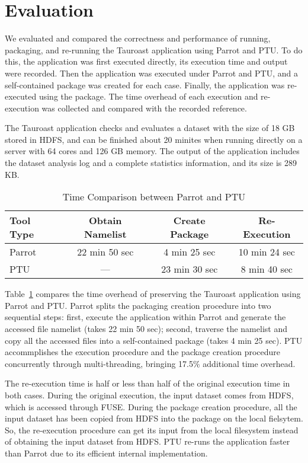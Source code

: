 \section{Evaluation}

We evaluated and compared the correctness and performance of running, packaging, and re-running the Tauroast application using Parrot and PTU.
To do this, the application was first executed directly, its execution time and output were recorded. Then the application was executed under Parrot and PTU, and a self-contained package was created for each case. Finally, the application was re-executed using the package. The time overhead of each execution and re-execution was collected and compared with the recorded reference.

The Tauroast application checks and evaluates a dataset with the size of 18 GB stored in HDFS, and can be finished about 20 minites when running directly on a server with 64 cores and 126 GB memory. The output of the application includes the dataset analysis log and a complete statistics information, and its size is 289 KB.

\begin{table}
\small
    \centering
    \begin{tabular}{lccc}
    \hline
    \bf Tool Type & \bf Obtain Namelist & \bf Create Package & \bf Re-Execution \\ \hline
	Parrot & 22 min 50 sec  & 4 min 25 sec & 10 min 24 sec \\ \hline
	PTU & --- & 23 min 30 sec & 8 min 40 sec \\ \hline 
    \end{tabular}
    \normalsize
    \caption{Time Comparison between Parrot and PTU}
    \label{table:parrot_ptu}
\end{table}    

Table~\ref{table:parrot_ptu} compares the time overhead of preserving the Tauroast application using Parrot and PTU.
Parrot splits the packaging creation procedure into two sequential steps: first, execute the application within Parrot and generate the accessed file namelist (takes 22 min 50 sec); second, traverse the namelist and copy all the accessed files into a self-contained package (takes 4 min 25 sec).
PTU accommplishes the execution procedure and the package creation procedure concurrently through multi-threading, bringing 17.5\% additional time overhead.

The re-execution time is half or less than half of the original execution time in both cases. During the original execution, the input dataset comes from HDFS, which is accessed through FUSE. During the package creation procedure, all the input dataset has been copied from HDFS into the package on the local fielsytem. So, the re-execution procedure can get its input from the local filesystem instead of obtaining the input dataset from HDFS.
PTU re-runs the application faster than Parrot due to its efficient internal implementation.

